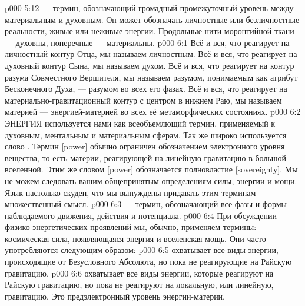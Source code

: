 \vs p000 5:12 \pc {} --- термин, обозначающий громадный промежуточный уровень между материальным и духовным. Он может обозначать личностные или безличностные реальности, живые или неживые энергии. Продольные нити моронтийной ткани --- духовны, поперечные --- материальны.
\vs p000 6:1 Всё и вся, что реагирует на личностный контур Отца, мы называем личностным. Всё и вся, что реагирует на духовный контур Сына, мы называем духом. Всё и вся, что реагирует на контур разума Совместного Вершителя, мы называем разумом, понимаемым как атрибут Бесконечного Духа, --- разумом во всех его фазах. Всё и вся, что реагирует на материально\hyp{}гравитационный контур с центром в нижнем Раю, мы называем материей --- энергией\hyp{}материей во всех её метаморфических состояниях.
\vs p000 6:2 \pc ЭНЕРГИЯ используется нами как всеобъемлющий термин, применяемый к духовным, ментальным и материальным сферам. Так же широко используется слово . Термин  [power] обычно ограничен обозначением электронного уровня вещества, то есть материи, реагирующей на линейную гравитацию в большой вселенной. Этим же словом [power] обозначается полновластие [sovereignty]. Мы не можем следовать вашим общепринятым определениям силы, энергии и мощи. Язык настолько скуден, что мы вынуждены придавать этим терминам множественный смысл.
\vs p000 6:3 \pc {} --- термин, обозначающий все фазы и формы наблюдаемого движения, действия и потенциала.
\vs p000 6:4 При обсуждении физико\hyp{}энергетических проявлений мы, обычно, применяем термины: космическая сила, появляющаяся энергия и вселенская мощь. Они часто употребляются следующим образом:
\vs p000 6:5 \bibnobreakspace {} охватывает все виды энергии, происходящие от Безусловного Абсолюта, но пока не реагирующие на Райскую гравитацию.
\vs p000 6:6 \bibnobreakspace {} охватывает все виды энергии, которые реагируют на Райскую гравитацию, но пока не реагируют на локальную, или линейную, гравитацию. Это предэлектронный уровень энергии\hyp{}материи.
